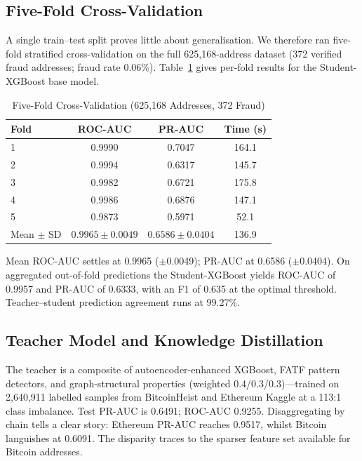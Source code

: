 \documentclass[journal]{IEEEtran}
\begin{document}
\subsection{Five-Fold Cross-Validation}
\label{sec:cv}

A single train--test split proves little about generalisation. We therefore ran five-fold stratified cross-validation on the full 625,168-address dataset (372 verified fraud addresses; fraud rate 0.06\%). Table~\ref{tab:cv} gives per-fold results for the Student-XGBoost base model.

\begin{table}[!t]
\centering
\caption{Five-Fold Cross-Validation (625,168 Addresses, 372 Fraud)}
\label{tab:cv}
\begin{tabular}{lccc}
\toprule
\textbf{Fold} & \textbf{ROC-AUC} & \textbf{PR-AUC} & \textbf{Time (s)} \\
\midrule
1 & 0.9990 & 0.7047 & 164.1 \\
2 & 0.9994 & 0.6317 & 145.7 \\
3 & 0.9982 & 0.6721 & 175.8 \\
4 & 0.9986 & 0.6876 & 147.1 \\
5 & 0.9873 & 0.5971 &  52.1 \\
\midrule
Mean $\pm$ SD & $0.9965 \pm 0.0049$ & $0.6586 \pm 0.0404$ & 136.9 \\
\bottomrule
\end{tabular}
\end{table}

Mean ROC-AUC settles at 0.9965 ($\pm$0.0049); PR-AUC at 0.6586 ($\pm$0.0404). On aggregated out-of-fold predictions the Student-XGBoost yields ROC-AUC of 0.9957 and PR-AUC of 0.6333, with an F1 of 0.635 at the optimal threshold. Teacher--student prediction agreement runs at 99.27\%.

\subsection{Teacher Model and Knowledge Distillation}

The teacher is a composite of autoencoder-enhanced XGBoost, FATF pattern detectors, and graph-structural properties (weighted 0.4/0.3/0.3)---trained on 2,640,911 labelled samples from BitcoinHeist and Ethereum Kaggle at a 113:1 class imbalance. Test PR-AUC is 0.6491; ROC-AUC 0.9255. Disaggregating by chain tells a clear story: Ethereum PR-AUC reaches 0.9517, whilst Bitcoin languishes at 0.6091. The disparity traces to the sparser feature set available for Bitcoin addresses.
\end{document}
